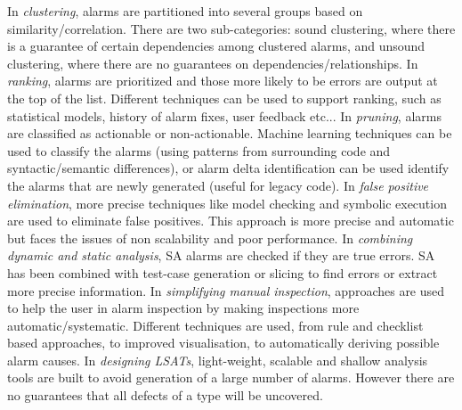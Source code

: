 \documentclass{article}
\begin{document}
 In \textit{clustering}, alarms are partitioned into several groups based on similarity/correlation. There are two sub-categories: sound clustering, where there is a guarantee of certain dependencies among clustered alarms, and unsound clustering, where there are no guarantees on dependencies/relationships. 
 In \textit{ranking}, alarms are prioritized and those more likely to be errors are output at the top of the list. Different techniques can be used to support ranking, such as statistical models, history of alarm fixes, user feedback etc... 
 In \textit{pruning}, alarms are classified as actionable or non-actionable. Machine learning techniques can be used to classify the alarms (using patterns from surrounding code and syntactic/semantic differences), or alarm delta identification can be used identify the alarms that are newly generated (useful for legacy code). 
 In \textit{false positive elimination}, more precise techniques like model checking and symbolic execution are used to eliminate false positives. This approach is more precise and automatic but faces the issues of non scalability and poor performance.
 In \textit{combining dynamic and static analysis}, SA alarms are checked if they are true errors. SA has been combined with test-case generation or slicing to find errors or extract more precise information.
 In \textit{simplifying manual inspection}, approaches are used to help the user in alarm inspection by making inspections more automatic/systematic. Different techniques are used, from rule and checklist based approaches, to improved visualisation, to automatically deriving possible alarm causes.
 In \textit{designing LSATs}, light-weight, scalable and shallow analysis tools are built to avoid generation of a large number of alarms. However there are no guarantees that all defects of a type will be uncovered.
\end{document}
